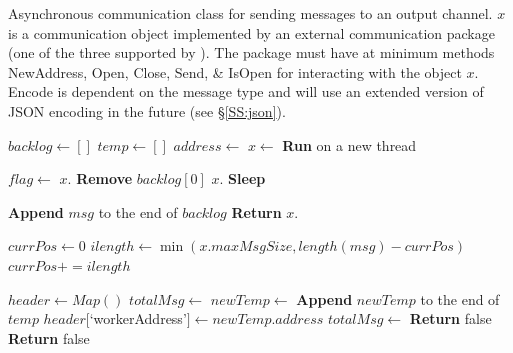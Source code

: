 \documentclass[journal]{IEEEtran}
\newcommand{\todo}[1]{{\color{red}{#1}}}
\newcommand{\pkg}{{\tt \todo{cis\_interface}}{}}
\begin{document}
\begin{appendices}
\begin{algorithm}[H]
    \caption{Asynchronous communication class for sending messages to an output channel. $x$ is a communication object implemented by an external communication package (one of the three supported by {\pkg}). The package must have at minimum methods {\sc NewAddress, Open, Close, Send, \& IsOpen} for interacting with the object $x$. {\sc Encode} is dependent on the message type and will use an extended version of JSON encoding in the future (see \S\ref{SS:json}).}
    \label{alg:async_send}
    \begin{algorithmic}[1]
    	\State $backlog \gets []$
	\State $temp \gets []$
		\State $address \gets$ 
	\EndIf
	\State $x \gets$ 
	\State \textbf{Run}  on a new thread
	\item[]
				\State $flag \gets$ $x.$
					\State \textbf{Remove} $backlog[0]$
				\Else
					\State $x.$
				\EndIf
			\Else
				\State \textbf{Sleep}
			\EndIf
    		\EndWhile
    	\EndClassMethod
	\item[]
			\State \textbf{Append} $msg$ to the end of $backlog$
		\EndIf
		\State \textbf{Return} $x.$
	\EndClassMethod
	\item[]
		\State $currPos \gets 0$
			\State $ilength \gets \min(x.maxMsgSize, length(msg) - currPos)$
			\State {}
			\State $currPos += ilength$
		\EndWhile
	\EndClassMethod
	\item[]
		\State $header \gets Map()$ 
		\State $totalMsg \gets $
			\State $newTemp \gets$ 
			\State \textbf{Append} $newTemp$ to the end of $temp$
			\State $header[$`workerAddress'$] \gets newTemp.address$
			\State $totalMsg \gets $
				\State \textbf{Return} false
			\EndIf
				\State \textbf{Return} false

\end{algorithmic}
\end{algorithm}
\end{appendices}
\end{document}
